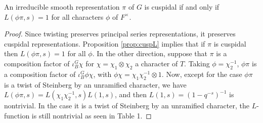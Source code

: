\begin{prop}\label{prop:twistL}
    An irreducible smooth  representation $\pi$ of $G$ is cuspidal if and only if $L(\phi\pi,s)=1$ for all characters $\phi$ of $F^\times$.
\end{prop}
\begin{proof}
    Since twisting preserves principal series representations, it preserves cuspidal representations. Proposition \ref{prop:cuspL} implies that if $\pi$ is cuspidal then $L(\phi\pi,s)=1$ for all $\phi$. In the other direction, suppose that $\pi$ is a composition factor of $\iota_B^G \chi$ for $\chi= \chi_1\otimes \chi_2$ a character of $T$. Taking $\phi=\chi_2^{-1}$, $\phi\pi$ is a composition factor of $\iota_B^G \phi\chi$, with $\phi\chi = \chi_1\chi_2^{-1} \otimes 1$. Now, except for the case $\phi\pi$ is a twist of Steinberg by an unramified character, we have $L(\phi\pi,s) = L(\chi_1\chi_2^{-1},s)L(1,s)$, and then $L(1,s)=(1-q^{-s})^{-1}$ is nontrivial. In the case it is a twist of Steinberg by an unramified character, the $L$-function is still nontrivial as seen in Table 1.
\end{proof}


